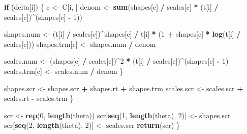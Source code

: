 \documentclass[
]{article}
\newenvironment{Shaded}{\begin{snugshade}}{\end{snugshade}}
\newcommand{\ControlFlowTok}[1]{\textcolor[rgb]{0.13,0.29,0.53}{\textbf{#1}}}
\newcommand{\DecValTok}[1]{\textcolor[rgb]{0.00,0.00,0.81}{#1}}
\newcommand{\KeywordTok}[1]{\textcolor[rgb]{0.13,0.29,0.53}{\textbf{#1}}}
\newcommand{\NormalTok}[1]{#1}
\newcommand{\OperatorTok}[1]{\textcolor[rgb]{0.81,0.36,0.00}{\textbf{#1}}}
\newcommand{\StringTok}[1]{\textcolor[rgb]{0.31,0.60,0.02}{#1}}
\theoremstyle{definition}
\theoremstyle{plain}
\theoremstyle{definition}
\theoremstyle{definition}
\theoremstyle{definition}
\theoremstyle{definition}
\theoremstyle{remark}
\begin{document}
\begin{Shaded}
\begin{Highlighting}[]
    \ControlFlowTok{if}\NormalTok{ (delta[i]) \{}
\NormalTok{      c \textless{}{-}}\StringTok{ }\NormalTok{C[i, ]}
\NormalTok{      denom \textless{}{-}}\StringTok{ }\KeywordTok{sum}\NormalTok{(shapes[c] }\OperatorTok{/}\StringTok{ }\NormalTok{scales[c] }\OperatorTok{*}
\StringTok{        }\NormalTok{(t[i] }\OperatorTok{/}\StringTok{ }\NormalTok{scales[c])}\OperatorTok{\^{}}\NormalTok{(shapes[c] }\OperatorTok{{-}}\StringTok{ }\DecValTok{1}\NormalTok{))}

\NormalTok{      shapes.num \textless{}{-}}\StringTok{ }\NormalTok{(t[i] }\OperatorTok{/}\StringTok{ }\NormalTok{scales[c])}\OperatorTok{\^{}}\NormalTok{shapes[c] }\OperatorTok{/}\StringTok{ }\NormalTok{t[i] }\OperatorTok{*}
\StringTok{        }\NormalTok{(}\DecValTok{1} \OperatorTok{+}\StringTok{ }\NormalTok{shapes[c] }\OperatorTok{*}\StringTok{ }\KeywordTok{log}\NormalTok{(t[i] }\OperatorTok{/}\StringTok{ }\NormalTok{scales[c]))}
\NormalTok{      shapes.trm[c] \textless{}{-}}\StringTok{ }\NormalTok{shapes.num }\OperatorTok{/}\StringTok{ }\NormalTok{denom}

\NormalTok{      scales.num \textless{}{-}}\StringTok{ }\NormalTok{(shapes[c] }\OperatorTok{/}\StringTok{ }\NormalTok{scales[c])}\OperatorTok{\^{}}\DecValTok{2} \OperatorTok{*}
\StringTok{        }\NormalTok{(t[i] }\OperatorTok{/}\StringTok{ }\NormalTok{scales[c])}\OperatorTok{\^{}}\NormalTok{(shapes[c] }\OperatorTok{{-}}\StringTok{ }\DecValTok{1}\NormalTok{)}
\NormalTok{      scales.trm[c] \textless{}{-}}\StringTok{ }\NormalTok{scales.num }\OperatorTok{/}\StringTok{ }\NormalTok{denom}
\NormalTok{    \}}

\NormalTok{    shapes.scr \textless{}{-}}\StringTok{ }\NormalTok{shapes.scr }\OperatorTok{+}\StringTok{ }\NormalTok{shapes.rt }\OperatorTok{+}\StringTok{ }\NormalTok{shapes.trm}
\NormalTok{    scales.scr \textless{}{-}}\StringTok{ }\NormalTok{scales.scr }\OperatorTok{+}\StringTok{ }\NormalTok{scales.rt }\OperatorTok{{-}}\StringTok{ }\NormalTok{scales.trm}
\NormalTok{  \}}

\NormalTok{  scr \textless{}{-}}\StringTok{ }\KeywordTok{rep}\NormalTok{(}\DecValTok{0}\NormalTok{, }\KeywordTok{length}\NormalTok{(theta))}
\NormalTok{  scr[}\KeywordTok{seq}\NormalTok{(}\DecValTok{1}\NormalTok{, }\KeywordTok{length}\NormalTok{(theta), }\DecValTok{2}\NormalTok{)] \textless{}{-}}\StringTok{ }\NormalTok{shapes.scr}
\NormalTok{  scr[}\KeywordTok{seq}\NormalTok{(}\DecValTok{2}\NormalTok{, }\KeywordTok{length}\NormalTok{(theta), }\DecValTok{2}\NormalTok{)] \textless{}{-}}\StringTok{ }\NormalTok{scales.scr}
  \KeywordTok{return}\NormalTok{(scr)}
\NormalTok{\}}
\end{Highlighting}
\end{Shaded}
\end{document}
